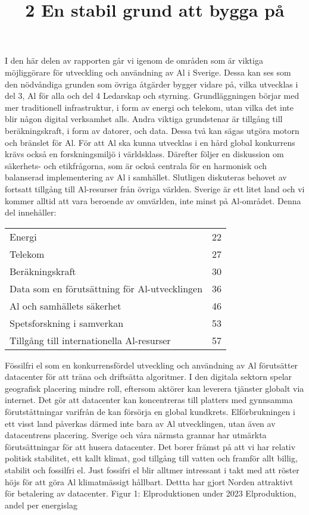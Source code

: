 {\title{
2 En stabil grund att bygga på
}
I den här delen av rapporten går vi igenom de områden som är viktiga möjliggörare för utveckling och användning av Al i Sverige. Dessa kan ses som den nödvåndiga grunden som övriga åtgärder bygger vidare på, vilka utvecklas i del 3, Al för alla och del 4 Ledarskap och styrning.
Grundläggningen börjar med mer traditionell infrastruktur, i form av energi och telekom, utan vilka det inte blir någon digital verksamhet alls. Andra viktiga grundstenar är tillgång till beräkningskraft, i form av datorer, och data. Dessa två kan sägas utgöra motorn och bränslet för Al. För att Al ska kunna utvecklas i en hård global konkurrens krävs också en forskningsmiljö i världsklass. Därefter följer en diskussion om säkerhets- och etikfrågorna, som är också centrala för en harmonisk och balanserad implementering av Al i samhället. Slutligen diskuteras behovet av fortsatt tillgång till Al-resurser från övriga världen. Sverige är ett litet land och vi kommer alltid att vara beroende av omvärlden, inte minst på Al-området.
Denna del innehåller:
\begin{tabular}{lr} 
Energi & 22 \\
Telekom & 27 \\
Beräkningskraft & 30 \\
Data som en förutsättning för Al-utvecklingen & 36 \\
Al och samhällets säkerhet & 46 \\
Spetsforskning i samverkan & 53 \\
Tillgång till internationella Al-resurser & 57
\end{tabular}

Fössilfri el som en konkurrensfördel utveckling och användning av Al förutsätter datacenter för att träna och driftsätta algoritmer. I den digitala sektorn spelar geografisk placering mindre roll, eftersom aktörer kan leverera tjänster globalt via internet. Det gör att datacenter kan koncentreras till platters med gynnsamma förutståttningar varifrån de kan försörja en global kundkrets. Elförbrukningen i ett visst land påverkas därmed inte bara av Al utvecklingen, utan även av datacentrens placering.
Sverige och våra närmsta grannar har utmärkta förutsättningar för att husera datacenter. Det borer främst på att vi har relativ politisk stabilitet, ett kallt klimat, god tillgång till vatten och framför allt billig, stabilit och fossilfri el. Just fossifri el blir alltmer intressant i takt med att röster höjs för att göra Al klimatmässigt hållbart. Dettta har gjort Norden attraktivt för betalering av datacenter.
Figur 1: Elproduktionen under 2023
Elproduktion, andel per energislag

}
